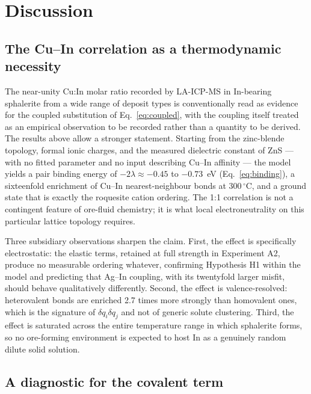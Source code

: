 \documentclass[11pt,a4paper]{article}
\begin{document}
\section{Discussion}

\subsection{The Cu--In correlation as a thermodynamic necessity}

The near-unity Cu:In molar ratio recorded by LA-ICP-MS in In-bearing sphalerite
from a wide range of deposit types is conventionally read as evidence for the
coupled substitution of Eq.~\eqref{eq:coupled}, with the coupling itself treated
as an empirical observation to be recorded rather than a quantity to be derived.
The results above allow a stronger statement. Starting from the zinc-blende
topology, formal ionic charges, and the measured dielectric constant of ZnS ---
with no fitted parameter and no input describing Cu--In affinity --- the model
yields a pair binding energy of $-2\lambda \approx -0.45$ to $-0.73$~eV
(Eq.~\eqref{eq:binding}), a sixteenfold enrichment of Cu--In nearest-neighbour
bonds at $300\,^\circ$C, and a ground state that is exactly the roquesite cation
ordering. The 1:1 correlation is not a contingent feature of ore-fluid
chemistry; it is what local electroneutrality on this particular lattice
topology requires.

Three subsidiary observations sharpen the claim. First, the effect is
specifically electrostatic: the elastic terms, retained at full strength in
Experiment A2, produce no measurable ordering whatever, confirming Hypothesis H1
within the model and predicting that Ag--In coupling, with its twentyfold larger
misfit, should behave qualitatively differently. Second, the effect is
valence-resolved: heterovalent bonds are enriched 2.7 times more strongly than
homovalent ones, which is the signature of $\delta q_i \delta q_j$ and not of
generic solute clustering. Third, the effect is saturated across the entire
temperature range in which sphalerite forms, so no ore-forming environment is
expected to host In as a genuinely random dilute solid solution.

\subsection{A diagnostic for the covalent term}
\label{sec:jdiagnostic}
\end{document}
